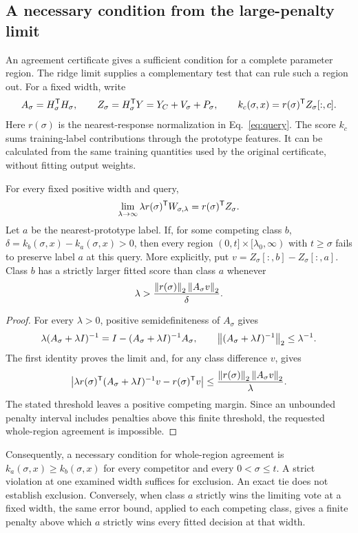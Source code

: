 \subsection{A necessary condition from the large-penalty limit}
\label{sec:ridge-obstruction}
An agreement certificate gives a sufficient condition for a complete parameter
region. The ridge limit supplies a complementary test that can rule such a
region out. For a fixed width, write
\[
 A_\sigma=H_\sigma^{\mathsf{T}} H_\sigma,\qquad
 Z_\sigma=H_\sigma^{\mathsf{T}} Y=Y_C+V_\sigma+P_\sigma,
 \qquad k_c(\sigma,x)=r(\sigma)^{\mathsf{T}} Z_\sigma[:,c].
\]
Here $r(\sigma)$ is the nearest-response normalization in
Eq.~\eqref{eq:query}. The score $k_c$ sums training-label contributions
through the prototype features. It can be calculated from the same training
quantities used by the original certificate, without fitting output weights.

\begin{proposition}
\label{prop:ridge-limit}
For every fixed positive width and query,
\[
 \lim_{\lambda\to\infty}\lambda r(\sigma)^{\mathsf{T}} W_{\sigma,\lambda}
 =r(\sigma)^{\mathsf{T}} Z_\sigma.
\]
Let $a$ be the nearest-prototype label. If, for some competing class $b$,
$\delta=k_b(\sigma,x)-k_a(\sigma,x)>0$, then every region
$(0,t]\times[\lambda_0,\infty)$ with $t\geq\sigma$ fails to preserve
label $a$ at this query. More explicitly, put
$v=Z_\sigma[:,b]-Z_\sigma[:,a]$. Class $b$ has a strictly larger fitted
score than class $a$ whenever
\[
 \lambda>\frac{\left\lVert r(\sigma)\right\rVert_2\left\lVert A_\sigma v\right\rVert_2}{\delta}.
\]
\end{proposition}
\begin{proof}
For every $\lambda>0$, positive semidefiniteness of $A_\sigma$ gives
\[
 \lambda(A_\sigma+\lambda I)^{-1}
 =I-(A_\sigma+\lambda I)^{-1}A_\sigma,
 \qquad
 \left\lVert(A_\sigma+\lambda I)^{-1}\right\rVert_2\leq\lambda^{-1}.
\]
The first identity proves the limit and, for any class difference $v$, gives
\[
 \left|\lambda r(\sigma)^{\mathsf{T}}(A_\sigma+\lambda I)^{-1}v
              -r(\sigma)^{\mathsf{T}} v\right|
 \leq\frac{\left\lVert r(\sigma)\right\rVert_2\left\lVert A_\sigma v\right\rVert_2}{\lambda}.
\]
The stated threshold leaves a positive competing margin. Since an unbounded
penalty interval includes penalties above this finite threshold, the requested
whole-region agreement is impossible.
\end{proof}

Consequently, a necessary condition for whole-region agreement is
$k_a(\sigma,x)\geq k_b(\sigma,x)$ for every competitor and every
$0<\sigma\leq t$. A strict violation at one examined width suffices for
exclusion. An exact tie does not establish exclusion. Conversely, when class
$a$ strictly wins the limiting vote at a fixed width, the same error bound,
applied to each competing class, gives a finite penalty above which $a$
strictly wins every fitted decision at that width.

